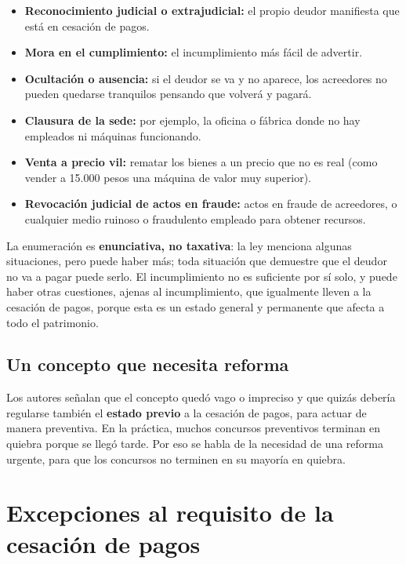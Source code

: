 \documentclass[12pt,oneside]{book}
\begin{document}
\begin{itemize}
    \item \textbf{Reconocimiento judicial o extrajudicial:} el propio deudor manifiesta que está en cesación de pagos.
    \item \textbf{Mora en el cumplimiento:} el incumplimiento más fácil de advertir.
    \item \textbf{Ocultación o ausencia:} si el deudor se va y no aparece, los acreedores no pueden quedarse tranquilos pensando que volverá y pagará.
    \item \textbf{Clausura de la sede:} por ejemplo, la oficina o fábrica donde no hay empleados ni máquinas funcionando.
    \item \textbf{Venta a precio vil:} rematar los bienes a un precio que no es real (como vender a 15.000 pesos una máquina de valor muy superior).
    \item \textbf{Revocación judicial de actos en fraude:} actos en fraude de acreedores, o cualquier medio ruinoso o fraudulento empleado para obtener recursos.
\end{itemize}

\begin{important}
La enumeración es \textbf{enunciativa, no taxativa}: la ley menciona algunas situaciones, pero puede haber más; toda situación que demuestre que el deudor no va a pagar puede serlo. El incumplimiento no es suficiente por sí solo, y puede haber otras cuestiones, ajenas al incumplimiento, que igualmente lleven a la cesación de pagos, porque esta es un estado general y permanente que afecta a todo el patrimonio.
\end{important}

\subsection{Un concepto que necesita reforma}

Los autores señalan que el concepto quedó vago o impreciso y que quizás debería regularse también el \textbf{estado previo} a la cesación de pagos, para actuar de manera preventiva. En la práctica, muchos concursos preventivos terminan en quiebra porque se llegó tarde. Por eso se habla de la necesidad de una reforma urgente, para que los concursos no terminen en su mayoría en quiebra.

\section{Excepciones al requisito de la cesación de pagos}
\end{document}
